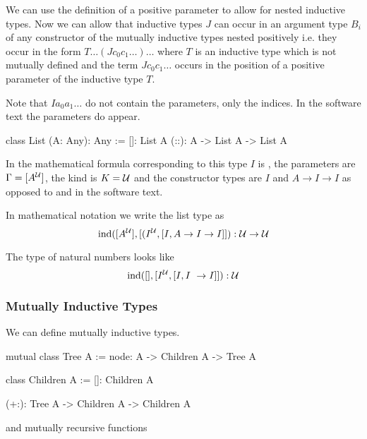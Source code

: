 We can use the definition of a positive parameter to allow for nested inductive
types. Now we can allow that inductive types $J$ can occur in an argument type
$B_i$ of any constructor of the mutually inductive types nested positively i.e.
they occur in the form $T \ldots (J c_0 c_1 \ldots) \ldots$ where $T$ is an
inductive type which is not mutually defined and the term $J c_0 c_1 \ldots$
occurs in the position of a positive parameter of the inductive type $T$.

Note that $I a_0 a_1 \ldots$ do not contain the parameters, only the indices. In
the software text the parameters do appear.


\begin{alba}
    class List (A: Any): Any :=
        []: List A
        (::): A -> List A -> List A
\end{alba}

In the mathematical formula corresponding to this type $I$ is , the
parameters are $\Gamma = [A^{\cal{U}}]$, the kind is $K = {\cal{U}}$ and the constructor
types are $I$ and $A \to I \to I$ as opposed to  and  in the software text.

In mathematical notation we write the list type as
$$
    \text{ind}([A^{\cal{U}}], [(I^{\cal{U}}, [I, A \to I \to I]]) : {\cal{U}} \to {\cal{U}}
$$

The type of natural numbers looks like
$$
    \ind([], [I^\Any, [I, I \to I]]) : \Any
$$








\subsubsection{Mutually Inductive Types}

We can define mutually inductive types.

\begin{alba}
    mutual
        class
            Tree A
        :=
            node: A -> Children A -> Tree A

        class
            Children A
        :=
            []: Children A

            (+:): Tree A -> Children A -> Children A
\end{alba}
%
and mutually recursive functions

